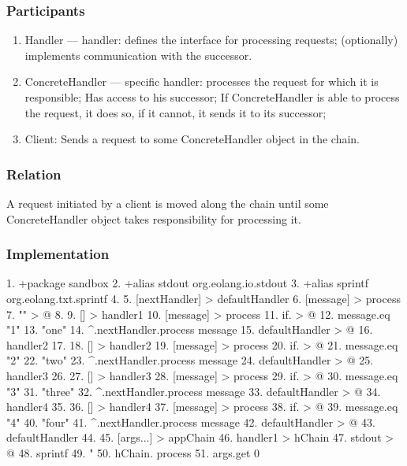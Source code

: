 \documentclass[12pt]{book}
\begin{document}
\subsubsection{Participants}
\begin{enumerate}
    \item Handler —  handler: defines the interface for processing requests; (optionally) implements communication with the successor.
    \item ConcreteHandler — specific handler: processes the request for which it is responsible; Has access to his successor; If ConcreteHandler  is able to process the request, it does so, if it cannot, it sends it to its successor;
    \item Client: Sends a request to some ConcreteHandler object in the chain.
\end{enumerate}

\subsubsection{Relation}
A request initiated by a client is moved along the chain until some ConcreteHandler object takes responsibility for processing it.

\subsubsection{Implementation}
\begin{ffcode}
1.	+package sandbox
2.	+alias stdout org.eolang.io.stdout
3.	+alias sprintf org.eolang.txt.sprintf
4.	
5.	[nextHandler] > defaultHandler
6.	  [message] > process
7.	    "" > @
8.	
9.	[] > handler1
10.	  [message] > process
11.	    if. > @
12.	      message.eq "1"
13.	      "one"
14.	      ^.nextHandler.process message
15.	  defaultHandler > @
16.	    handler2
17.	
18.	[] > handler2
19.	  [message] > process
20.	    if. > @
21.	      message.eq "2"
22.	      "two"
23.	      ^.nextHandler.process message
24.	  defaultHandler > @
25.	    handler3
26.	
27.	[] > handler3
28.	  [message] > process
29.	    if. > @
30.	      message.eq "3"
31.	      "three"
32.	      ^.nextHandler.process message
33.	  defaultHandler > @
34.	    handler4
35.	
36.	[] > handler4
37.	  [message] > process
38.	    if. > @
39.	      message.eq "4"
40.	      "four"
41.	      ^.nextHandler.process message
42.	  defaultHandler > @
43.	    defaultHandler
44.	
45.	[args...] > appChain
46.	  handler1 > hChain
47.	  stdout > @
48.	    sprintf
49.	      "%
50.	hChain. process
51.	        args.get 0 

\end{ffcode}
\end{document}
